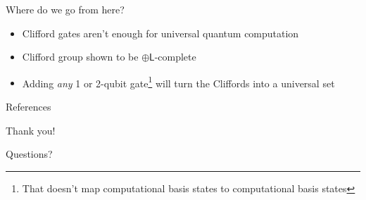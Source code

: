 \documentclass[11pt,aspectratio=1610]{beamer}
\begin{document}
\begin{frame}{Where do we go from here?}
	\begin{itemize}[<+->]
		\item Clifford gates aren't enough for universal quantum computation
		\item Clifford group shown to be $\oplus\bm{\mathsf{L}}$-complete \cite{aaronson}
		\item Adding \emph{any} 1 or 2-qubit gate\footnote<3->{That doesn't map computational basis states to computational basis states} will turn the Cliffords into a universal set \cite{shi}
	\end{itemize}
\end{frame}

\begin{frame}[allowframebreaks]{References}
	\nocite{*}
	
	
\end{frame}

\begin{frame}[standout]
	\smiley Thank you!\smiley

	Questions?
\end{frame}
\end{document}
